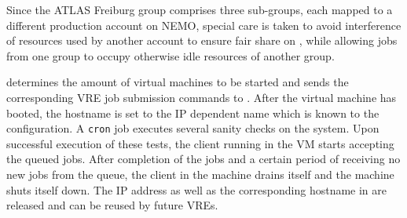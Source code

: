 Since the ATLAS Freiburg group comprises three sub-groups, each mapped
to a different production account on NEMO, special care is taken to
avoid interference of resources used by another account to ensure fair share on \NEMO, while
allowing jobs from one group to occupy otherwise idle resources of another group.

\Roced determines the amount of virtual machines to be started and sends the
corresponding VRE job submission commands to \Moab.
After the virtual machine has booted, the hostname is set to the IP
dependent name which is known to the \Slurm configuration.
A \texttt{cron} job executes several sanity
checks on the system.
Upon successful execution of these tests, the \Slurm client
running in the VM starts accepting the queued jobs.
After completion of the jobs and a certain period of receiving no new jobs from the queue, the
\Slurm client in the machine drains itself and the machine
shuts itself down.
The IP address as well as the corresponding hostname in \Slurm
are released and can be reused by future VREs.

